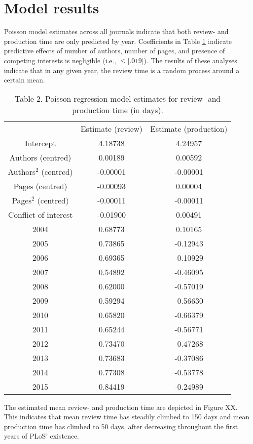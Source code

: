 \section*{Model results}
Poisson model estimates across all journals indicate that both review- and production time are only predicted by year. Coefficients in Table \ref{tab:tab2} indicate predictive effects of number of authors, number of pages, and presence of competing interests is negligible (i.e., $\leq |.019|$). The results of these analyses indicate that in any given year, the review time is a random process around a certain mean.

\begin{table}
\caption{Table 2. Poisson regression model estimates for review- and production time (in days).}
\label{tab:tab2}
\begin{tabular}{ c c c }
    & Estimate (review) & Estimate (production) \\
    Intercept & 4.18738 & 4.24957 \\
    Authors (centred) & 0.00189 & 0.00592 \\
    Authors$^2$ (centred) & -0.00001 & -0.00001 \\
    Pages (centred) & -0.00093 & 0.00004 \\
    Pages$^2$ (centred) & -0.00011 & -0.00011 \\
    Conflict of interest & -0.01900 & 0.00491 \\
    2004  & 0.68773 & 0.10165 \\
    2005  & 0.73865 & -0.12943 \\
    2006  & 0.69365 & -0.10929 \\
    2007  & 0.54892 & -0.46095 \\
    2008  & 0.62000 & -0.57019 \\
    2009  & 0.59294 & -0.56630 \\
    2010  & 0.65820 & -0.66379 \\
    2011  & 0.65244 & -0.56771 \\
    2012  & 0.73470 & -0.47268 \\
    2013  & 0.73683 & -0.37086 \\
    2014  & 0.77308 & -0.53778 \\
    2015  & 0.84419 & -0.24989 \\
\end{tabular}
\end{table}

The estimated mean review- and production time are depicted in Figure XX. This indicates that mean review time has steadily climbed to 150 days and mean production time has climbed to 50 days, after decreasing throughout the first years of PLoS' existence.

